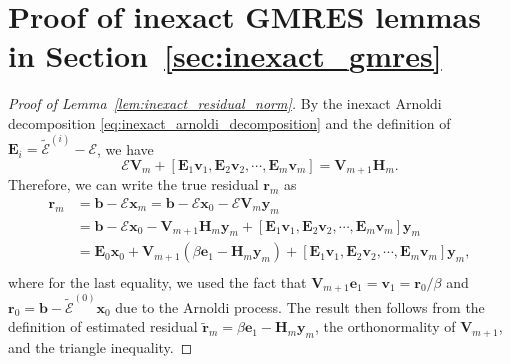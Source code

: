 \documentclass[hidelinks,onefignum,onetabnum]{siamart250211}
\newif\ifarXiv\arXivfalse
\begin{document}
%
%
%

\ifarXiv
    \appendix
\section{Proof of inexact GMRES lemmas in Section~\ref{sec:inexact_gmres}}
\label{supp:proofs}
\begin{proof}[Proof of Lemma~\ref{lem:inexact_residual_norm}]
  By the inexact Arnoldi decomposition \eqref{eq:inexact_arnoldi_decomposition} and the definition of $\bm E_i = \widetilde{\bm{\mathcal E}}^{(i)} - \bm{\mathcal E}$, we have
  \begin{equation}
    \bm{\mathcal E} \bm V_m + \left[ \bm E_1 \bm v_1, \bm E_2 \bm v_2, \cdots, \bm E_m \bm v_m \right] = \bm V_{m+1} \bm H_m.
  \end{equation}
  Therefore, we can write the true residual $\bm r_m$ as
  \begin{equation}
      \begin{aligned}
          \bm r_m &= \bm b - \bm{\mathcal E} \bm x_m = \bm b - \bm{\mathcal E} \bm x_0 - \bm{\mathcal E} \bm V_m \bm y_m \\
          & = \bm b - \bm{\mathcal E} \bm x_0 - \bm V_{m+1} \bm H_m \bm y_m + \left[ \bm E_1 \bm v_1, \bm E_2 \bm v_2, \cdots, \bm E_m \bm v_m \right] \bm y_m \\
          & =  \bm E_0 \bm x_0 + \bm V_{m+1} \left( \beta \bm e_1 - \bm H_m \bm y_m \right) + \left[ \bm E_1 \bm v_1, \bm E_2 \bm v_2, \cdots, \bm E_m \bm v_m \right] \bm y_m, \\
      \end{aligned}
  \end{equation}
  where for the last equality, we used the fact that
  $\bm V_{m+1}\bm e_1 = \bm v_1 = \bm r_0/\beta$
  and $\bm r_0 = \bm b - \widetilde{\bm{\mathcal E}}^{(0)} \bm x_0$
  due to the Arnoldi process. The result then follows from the definition
  of estimated residual $\widetilde{\bm r}_m = \beta \bm e_1 - \bm H_m \bm y_m$,
  the orthonormality of $\bm V_{m+1}$, and the triangle inequality.
\end{proof}
\end{document}
